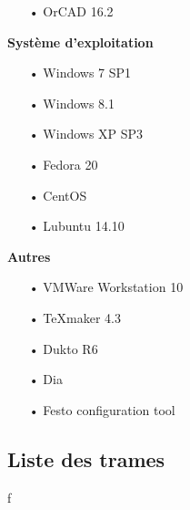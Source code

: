 \documentclass[10pt,a4paper,final]{article}
\begin{document}
\begin{spacing}{1.5}
\begin{flushleft}
\begin{multicols}{3}
\begin{itemize}
\item[•]OrCAD 16.2
\end{itemize}

\bigskip

\textbf{Système d'exploitation}
\begin{itemize}
\item[•]Windows 7 SP1
\item[•]Windows 8.1
\item[•]Windows XP SP3
\item[•]Fedora 20
\item[•]CentOS
\item[•]Lubuntu 14.10
\end{itemize}

\textbf{Autres}
\begin{itemize}
\item[•]VMWare Workstation 10
\item[•]TeXmaker 4.3
\item[•]Dukto R6
\item[•]Dia
\item[•]Festo configuration tool
\end{itemize}

\end{multicols}
\end{flushleft}
\begin{flushleft}
\HRule
\end{flushleft}

\pagebreak
\subsection{Liste des trames}


\end{spacing}
f
\end{document}

